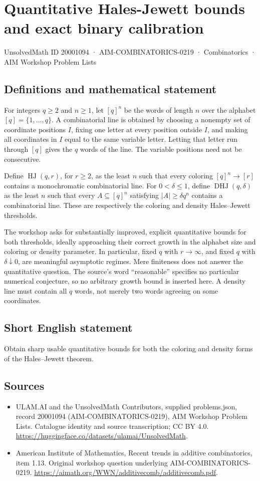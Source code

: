 \documentclass[11pt,a4paper]{article}
\begin{document}
\section*{Quantitative Hales-Jewett bounds and exact binary calibration}\label{20001094}
{\small UnsolvedMath ID 20001094 · AIM-COMBINATORICS-0219 · Combinatorics · AIM Workshop Problem Lists}
\subsection{Definitions and mathematical statement}
For integers $q\ge2$ and $n\ge1$, let $[q]^n$ be the words of length
$n$ over the alphabet $[q]=\{1,\ldots,q\}$. A combinatorial line
is obtained by choosing a nonempty set of coordinate positions $I$,
fixing one letter at every position outside $I$, and making all
coordinates in $I$ equal to the same variable letter. Letting that
letter run through $[q]$ gives the $q$ words of the line.
The variable positions need not be consecutive.

Define $\operatorname{HJ}(q,r)$, for $r\ge2$, as the least $n$ such
that every coloring $[q]^n\to[r]$ contains a monochromatic
combinatorial line. For $0<\delta\le1$, define
$\operatorname{DHJ}(q,\delta)$ as the least $n$ such that every
$A\subseteq[q]^n$ satisfying $|A|\ge\delta q^n$ contains a
combinatorial line. These are respectively the coloring and density
Hales--Jewett thresholds.

The workshop asks for substantially improved, explicit quantitative
bounds for both thresholds, ideally approaching their correct growth
in the alphabet size and coloring or density parameter. In particular,
fixed $q$ with $r\to\infty$, and fixed $q$ with $\delta\downarrow0$,
are meaningful asymptotic regimes. Mere finiteness does not answer
the quantitative question. The source's word ``reasonable'' specifies
no particular numerical conjecture, so no arbitrary growth bound is
inserted here. A density line must contain all $q$ words, not merely
two words agreeing on some coordinates.
\subsection{Short English statement}
Obtain sharp usable quantitative bounds for both the coloring and density forms of the Hales–Jewett theorem.
\subsection{Sources}
\begin{itemize}
\item[S1] ULAM.AI and the UnsolvedMath Contributors, supplied problems.json, record 20001094 (AIM-COMBINATORICS-0219), AIM Workshop Problem Lists. Catalogue identity and source transcription; CC BY 4.0.
\url{https://huggingface.co/datasets/ulamai/UnsolvedMath}.
\item[S2] American Institute of Mathematics, Recent trends in additive combinatorics, item 1.13. Original workshop question underlying AIM-COMBINATORICS-0219.
\url{https://aimath.org/WWN/additivecomb/additivecomb.pdf}.
\end{itemize}
\end{document}

